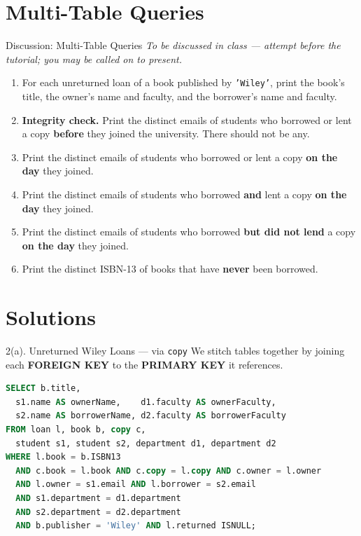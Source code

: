 \documentclass{beamer}
\begin{document}
\section{Multi-Table Queries}

\begin{frame}{Discussion: Multi-Table Queries}
\footnotesize
\textit{To be discussed in class --- attempt before the tutorial; you may be called on to present.}
\begin{enumerate}
  \item[(a)] For each unreturned loan of a book published by \texttt{'Wiley'}, print the book's title, the owner's name and faculty, and the borrower's name and faculty.
  \item[(b)] \textbf{Integrity check.} Print the distinct emails of students who borrowed or lent a copy \textbf{before} they joined the university. There should not be any.
  \item[(c)] Print the distinct emails of students who borrowed or lent a copy \textbf{on the day} they joined.
  \item[(d)] Print the distinct emails of students who borrowed \textbf{and} lent a copy \textbf{on the day} they joined.
  \item[(e)] Print the distinct emails of students who borrowed \textbf{but did not lend} a copy \textbf{on the day} they joined.
  \item[(f)] Print the distinct ISBN-13 of books that have \textbf{never} been borrowed.
\end{enumerate}
\end{frame}

\section{Solutions}

\begin{frame}[fragile]{2(a). Unreturned Wiley Loans --- via \texttt{copy}}
\small
We stitch tables together by joining each \textbf{FOREIGN KEY} to the \textbf{PRIMARY KEY} it references.
\begin{lstlisting}[language=SQL]
SELECT b.title,
  s1.name AS ownerName,    d1.faculty AS ownerFaculty,
  s2.name AS borrowerName, d2.faculty AS borrowerFaculty
FROM loan l, book b, copy c,
  student s1, student s2, department d1, department d2
WHERE l.book = b.ISBN13
  AND c.book = l.book AND c.copy = l.copy AND c.owner = l.owner
  AND l.owner = s1.email AND l.borrower = s2.email
  AND s1.department = d1.department
  AND s2.department = d2.department
  AND b.publisher = 'Wiley' AND l.returned ISNULL;
\end{lstlisting}
\end{frame}
\end{document}
